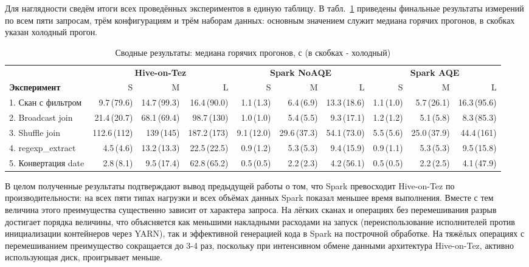 \documentclass[12pt,letterpaper, onecolumn]{exam}
\begin{document}
Для наглядности сведём итоги всех проведённых экспериментов в единую таблицу.
В табл.~\ref{tab:summary} приведены финальные результаты измерений по всем пяти
запросам, трём конфигурациям и трём наборам данных: основным значением служит
медиана горячих прогонов, в скобках указан холодный прогон.

\begin{table}[ht]
\centering
\caption{Сводные результаты: медиана горячих прогонов, с (в скобках - холодный)}
\label{tab:summary}
\scriptsize
\setlength{\tabcolsep}{3pt}
\begin{tabular}{|l|r|r|r|r|r|r|r|r|r|}
\hline
& \multicolumn{3}{c|}{\textbf{Hive-on-Tez}}
& \multicolumn{3}{c|}{\textbf{Spark NoAQE}}
& \multicolumn{3}{c|}{\textbf{Spark AQE}} \\
\cline{2-10}
\textbf{Эксперимент} & S & M & L & S & M & L & S & M & L \\
\hline
1. Скан с фильтром & 9.7\,(79.6) & 14.7\,(99.3) & 16.4\,(90.0) & 1.1\,(1.3) & 6.4\,(6.9) & 13.3\,(18.6) & 1.1\,(1.0) & 5.7\,(26.1) & 16.3\,(95.6) \\
2. Broadcast join & 21.4\,(20.7) & 68.1\,(69.4) & 98.7\,(130) & 1.0\,(1.0) & 5.4\,(5.5) & 9.3\,(17.1) & 1.2\,(1.2) & 5.1\,(5.8) & 8.3\,(85.3) \\
3. Shuffle join & 112.6\,(112) & 139\,(145) & 187.2\,(173) & 9.1\,(12.0) & 29.6\,(37.3) & 54.1\,(73.0) & 5.5\,(5.6) & 25.0\,(37.9) & 44.4\,(161) \\
4. regexp\_extract & 4.5\,(4.6) & 13.2\,(13.3) & 22.5\,(22.5) & 0.9\,(1.2) & 5.3\,(5.3) & 9.4\,(15.9) & 0.9\,(1.1) & 5.3\,(5.3) & 9.5\,(15.8) \\
5. Конвертация date & 2.8\,(8.1) & 9.5\,(17.4) & 62.8\,(65.2) & 0.5\,(0.5) & 2.2\,(2.3) & 4.2\,(56.1) & 0.5\,(0.5) & 2.2\,(2.5) & 4.1\,(47.9) \\
\hline
\end{tabular}
\end{table}

В целом полученные результаты подтверждают вывод предыдущей работы о том, что
Spark превосходит Hive-on-Tez по производительности: на всех пяти типах нагрузки
и всех объёмах данных Spark показал меньшее время выполнения. Вместе с тем
величина этого преимущества существенно зависит от характера запроса. На лёгких
сканах и операциях без перемешивания разрыв достигает порядка величины, что
объясняется как меньшими накладными расходами на запуск (переиспользование
исполнителей против инициализации контейнеров через YARN), так и эффективной
генерацией кода в Spark на построчной обработке. На тяжёлых операциях с
перемешиванием преимущество сокращается до 3-4 раз, поскольку при интенсивном
обмене данными архитектура Hive-on-Tez, активно использующая диск, проигрывает
меньше.
\end{document}
